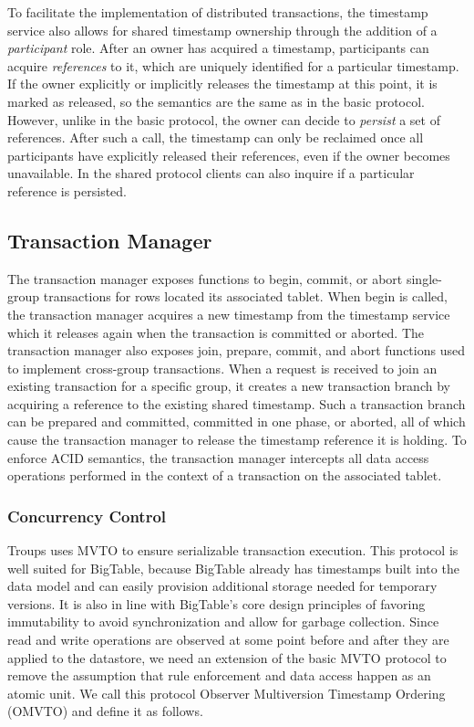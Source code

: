 \documentclass[10pt,final,journal]{IEEEtran}
\begin{document}
To facilitate the implementation of distributed transactions, the timestamp service also allows for shared timestamp ownership through the addition of a \emph{participant} role. After an owner has acquired a timestamp, participants can acquire \emph{references} to it, which are uniquely identified for a particular timestamp. If the owner explicitly or implicitly releases the timestamp at this point, it is marked as released, so the semantics are the same as in the basic protocol. However, unlike in the basic protocol, the owner can decide to \emph{persist} a set of references. After such a call, the timestamp can only be reclaimed once all participants have explicitly released their references, even if the owner becomes unavailable. In the shared protocol clients can also inquire if a particular reference is persisted.

\subsection{Transaction Manager}
The transaction manager exposes functions to begin, commit, or abort single-group transactions for rows located its associated tablet. When begin is called, the transaction manager acquires a new timestamp from the timestamp service which it releases again when the transaction is committed or aborted. The transaction manager also exposes join, prepare, commit, and abort functions used to implement cross-group transactions. When a request is received to join an existing transaction for a specific group, it creates a new transaction branch by acquiring a reference to the existing shared timestamp. Such a transaction branch can be prepared and committed, committed in one phase, or aborted, all of which cause the transaction manager to release the timestamp reference it is holding. To enforce ACID semantics, the transaction manager intercepts all data access operations performed in the context of a transaction on the associated tablet.

\subsubsection{Concurrency Control}
Troups uses MVTO to ensure serializable transaction execution. This protocol is well suited for BigTable, because BigTable already has timestamps built into the data model and can easily provision additional storage needed for temporary versions. It is also in line with BigTable's core design principles of favoring immutability to avoid synchronization and allow for garbage collection. Since read and write operations are observed at some point before and after they are applied to the datastore, we need an extension of the basic MVTO protocol to remove the assumption that rule enforcement and data access happen as an atomic unit. We call this protocol Observer Multiversion Timestamp Ordering (OMVTO) and define it as follows.
\end{document}
